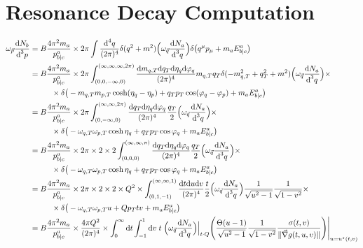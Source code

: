 \section{Resonance Decay Computation}
\label{sec:Apdx_ResonanceComput}

\begin{subequations}
    \begin{align}
        \omega_{\vec{p}}\frac{\text{d} N_b}{\text{d}^3p}&=B\frac{4\pi^2m_a}{p^a_{b\vert c}}\times2\pi\int\frac{\text{d}^4q}{(2\pi)^4}\delta(q^2+m^2)\Big(\omega_{\vec{q}}\frac{\text{d} N_a}{\text{d}^3 q}\Big)\delta\big(q^\mu p_\mu+m_a E^a_{b\vert c}\big)\\
        &=B\frac{4\pi^2m_a}{p^a_{b\vert c}}\times2\pi\int_{(0,0,-\infty,0)}^{(\infty,\infty,\infty,2\pi)}\frac{\text{d} m_{q,T} \text{d} q_T\text{d}\eta_q\text{d}\varphi_q}{(2\pi)^4}m_{q,T} q_T\delta(-m_{q,T}^2+q_T^2+m^2)\Big(\omega_{\vec{q}}\frac{\text{d} N_a}{\text{d}^3 q}\Big)\times\nonumber\\
        &\phantom{=}\qquad\times\delta\big(-m_{q,T} m_{p,T}\cosh(\eta_q-\eta_p)+q_Tp_T\cos(\varphi_q-\varphi_p)+m_a E^a_{b\vert c}\big)\\
        &=B\frac{4\pi^2m_a}{p^a_{b\vert c}}\times2\pi\int_{(0,-\infty,0)}^{(\infty,\infty,2\pi)}\frac{\text{d} q_T\text{d}\eta_q\text{d}\varphi_q}{(2\pi)^4}\frac{q_T}{2}\Big(\omega_{\vec{q}}\frac{\text{d} N_a}{\text{d}^3 q}\Big)\times\nonumber\\
        &\phantom{=}\qquad\times\delta\big(-\omega_{q,T} \omega_{p,T}\cosh\eta_q+q_Tp_T\cos\varphi_q+m_a E^a_{b\vert c}\big)\\
        &=B\frac{4\pi^2m_a}{p^a_{b\vert c}}\times2\pi\times 2\times 2\int_{(0,0,0)}^{(\infty,\infty,\pi)}\frac{\text{d} q_T\text{d}\eta_q\text{d}\varphi_q}{(2\pi)^4}\frac{q_T}{2}\Big(\omega_{\vec{q}}\frac{\text{d} N_a}{\text{d}^3 q}\Big)\times\nonumber\\
        &\phantom{=}\qquad\times\delta\big(-\omega_{q,T} \omega_{p,T}\cosh\eta_q+q_Tp_T\cos\varphi_q+m_a E^a_{b\vert c}\big)\\
        &=B\frac{4\pi^2m_a}{p^a_{b\vert c}}\times2\pi\times 2\times 2\times Q^2\times\int_{(0,1,-1)}^{(\infty,\infty,1)}\frac{\text{d} t\text{d} u\text{d} v}{(2\pi)^4}\frac{t}{2}\Big(\omega_{\vec{q}}\frac{\text{d} N_a}{\text{d}^3 q}\Big)\frac{1}{\sqrt{u^2-1}}\frac{1}{\sqrt{1-v^2}}\times\nonumber\\
        &\phantom{=}\qquad\times\delta\big(-\omega_{q,T} \omega_{p,T} u+Q p_T tv+m_a E^a_{b\vert c}\big)\\
        &=B\frac{4\pi^2m_a}{p^a_{b\vert c}}\times\frac{4\pi Q^2}{(2\pi)^4}\times\int_0^\infty\text{d} t\int_{-1}^1\text{d} v\;t\;\Big(\omega_{\vec{q}}\frac{\text{d} N_a}{\text{d}^3 q}\Big)\Big\vert_{t\cdot Q }\Bigg(\frac{\Theta(u-1)}{\sqrt{u^2-1}}\frac{1}{\sqrt{1-v^2}}\frac{\sigma(t,v)}{\Vert\vec{\nabla}g(t,u,v)\Vert}\Bigg)\Bigg\vert_{u=u^\star(t,v)}        
    \end{align}
\end{subequations}